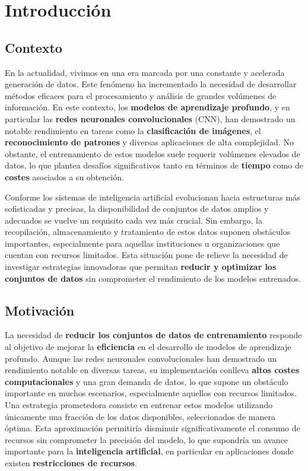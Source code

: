 
\chapter{Introducción}\label{ch:introduccion}

\section{Contexto}\label{sec:contexto}
En la actualidad, vivimos en una era marcada por una constante y acelerada generación de datos.
Este fenómeno ha incrementado la necesidad de desarrollar métodos eficaces para el procesamiento y análisis de grandes
volúmenes de información.
En este contexto, los \textbf{modelos de aprendizaje profundo}, y en particular las
\textbf{redes neuronales convolucionales} (CNN), han demostrado un notable rendimiento en tareas como la
\textbf{clasificación de imágenes}, el \textbf{reconocimiento de patrones} y diversas aplicaciones de alta complejidad.
No obstante, el entrenamiento de estos modelos suele requerir volúmenes elevados de datos, lo que plantea desafíos
significativos tanto en términos de \textbf{tiempo} como de \textbf{costes} asociados a su obtención.



Conforme los sistemas de inteligencia artificial evolucionan hacia estructuras más sofisticadas y precisas, la
disponibilidad de conjuntos de datos amplios y adecuados se vuelve un requisito cada vez más crucial.
Sin embargo, la recopilación, almacenamiento y tratamiento de estos datos suponen obstáculos importantes, especialmente
para aquellas instituciones u organizaciones que cuentan con recursos limitados.
Esta situación pone de relieve la necesidad de investigar estrategias innovadoras que permitan
\textbf{reducir y optimizar los conjuntos de datos} sin comprometer el rendimiento de los modelos entrenados.


\section{Motivación}\label{sec:motivacion}
La necesidad de \textbf{reducir los conjuntos de datos de entrenamiento} responde al objetivo de mejorar la
\textbf{eficiencia} en el desarrollo de modelos de aprendizaje profundo.
Aunque las redes neuronales convolucionales han demostrado un rendimiento notable en diversas tareas, su implementación
conlleva \textbf{altos costes computacionales} y una gran demanda de datos, lo que  supone un obstáculo importante en muchos escenarios,
especialmente aquellos con recursos limitados.
Una estrategia prometedora consiste en entrenar estos modelos utilizando únicamente una fracción de los datos
disponibles, seleccionados de manera óptima.
Esta aproximación permitiría disminuir significativamente el consumo de recursos sin comprometer la precisión del
modelo, lo que supondría un avance importante para la \textbf{inteligencia artificial}, en particular en aplicaciones
donde existen \textbf{restricciones de recursos}.


